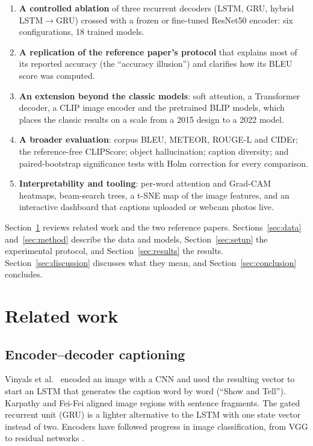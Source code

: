 \documentclass[11pt]{article}
\begin{document}
\begin{enumerate}
\item \textbf{A controlled ablation} of three recurrent decoders (LSTM, GRU, hybrid LSTM$\rightarrow$GRU) crossed with a frozen or fine-tuned ResNet50 encoder: six configurations, 18 trained models.
\item \textbf{A replication of the reference paper's protocol} that explains most of its reported accuracy (the ``accuracy illusion'') and clarifies how its BLEU score was computed.
\item \textbf{An extension beyond the classic models}: soft attention, a Transformer decoder, a CLIP image encoder and the pretrained BLIP models, which places the classic results on a scale from a 2015 design to a 2022 model.
\item \textbf{A broader evaluation}: corpus BLEU, METEOR, ROUGE-L and CIDEr; the reference-free CLIPScore; object hallucination; caption diversity; and paired-bootstrap significance tests with Holm correction for every comparison.
\item \textbf{Interpretability and tooling}: per-word attention and Grad-CAM heatmaps, beam-search trees, a t-SNE map of the image features, and an interactive dashboard that captions uploaded or webcam photos live.
\end{enumerate}

Section~\ref{sec:related} reviews related work and the two reference papers. Sections~\ref{sec:data} and~\ref{sec:method} describe the data and models, Section~\ref{sec:setup} the experimental protocol, and Section~\ref{sec:results} the results. Section~\ref{sec:discussion} discusses what they mean, and Section~\ref{sec:conclusion} concludes.

\section{Related work}\label{sec:related}

\subsection{Encoder--decoder captioning}
Vinyals et al.\ \cite{vinyals2015} encoded an image with a CNN and used the resulting vector to start an LSTM \cite{hochreiter1997} that generates the caption word by word (``Show and Tell''). Karpathy and Fei-Fei \cite{karpathy2015} aligned image regions with sentence fragments. The gated recurrent unit (GRU) \cite{cho2014} is a lighter alternative to the LSTM with one state vector instead of two. Encoders have followed progress in image classification, from VGG \cite{simonyan2015} to residual networks \cite{he2016}.
\end{document}
